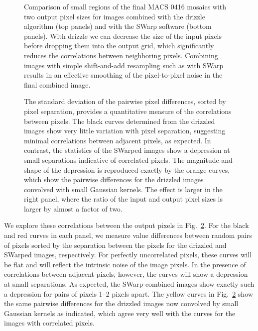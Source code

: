 \documentclass[preprint2]{aastex6}
\begin{document}
\begin{figure}[!t]
\caption{Comparison of small regions of the final MACS 0416 mosaics with two output pixel sizes for images combined with the drizzle algorithm (top panels) and with the SWarp software (bottom panels).  With drizzle we can decrease the size of the input pixels before dropping them into the output grid, which significantly reduces the correlations between neighboring pixels.  Combining images with simple shift-and-add resampling such as with SWarp results in an effective smoothing of the pixel-to-pixel noise in the final combined image. 
\label{fig:drizzle_cutout}}  
\end{figure}

\begin{figure}[!t]
\caption{The standard deviation of the pairwise pixel differences, sorted by pixel separation, provides a quantitative measure of the correlations between pixels.  The black curves determined from the drizzled images show very little variation with pixel separation, suggesting minimal correlations between adjacent pixels, as expected.  In contrast, the statistics of the SWarped images show a depression at small separations indicative of correlated pixels.  The magnitude and shape of the depression is reproduced exactly by the orange curves, which show the pairwise differences for the drizzled images convolved with small Gaussian kernels.  The effect is larger in the right panel, where the ratio of the input and output pixel sizes is larger by almost a factor of two.
\label{fig:corr_noise}}  
\end{figure}


We explore these correlations between the output pixels in Fig.~\ref{fig:corr_noise}.  For the black and red curves in each panel, we measure value differences between random pairs of pixels sorted by the separation between the pixels for the drizzled and SWarped images, respectively.  For perfectly uncorrelated pixels, these curves will be flat and will reflect the intrinsic noise of the image pixels.  In the presence of correlations between adjacent pixels, however, the curves will show a depression at small separations.  As expected, the SWarp-combined images show exactly such a depression for pairs of pixels 1--2 pixels apart.  The yellow curves in Fig.~\ref{fig:corr_noise} show the same pairwise differences for the drizzled images now convolved by small Gaussian kernels as indicated, which agree very well with the curves for the images with correlated pixels.  
\end{document}
